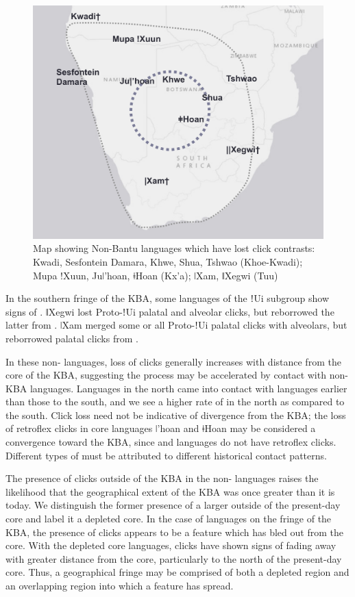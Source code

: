\documentclass[output=paper,newtxmath,modfonts,nonflat,draftmode]{langsci/langscibook}
\begin{document}
\begin{figure}
\includegraphics[height=.35\textheight]{figures/sands-fig5.png}
\caption{Map showing Non-Bantu languages which have lost click contrasts: Kwadi, Sesfontein Damara, Khwe, Shua, Tshwao (Khoe-Kwadi); Mupa !Xuun, Juǀ'hoan, ǂHoan (Kx'a); ǀXam, ǁXegwi (Tuu)} 
\label{fig:sands:5}
\end{figure}

In the southern fringe of the KBA, some  languages of the ǃUi subgroup show signs of . ǁXegwi lost Proto-ǃUi palatal and alveolar clicks, but reborrowed the latter from  \citep{sands2014, Traill1997}. ǀXam merged some or all Proto-ǃUi palatal clicks with alveolars, but reborrowed palatal clicks from  \citep{sands2014}. 

In these non- languages, loss of clicks generally increases with distance from the core of the KBA, suggesting the process may be accelerated by contact with non-KBA languages. Languages in the north came into contact with  languages earlier than those to the south, and we see a higher rate of  in the north as compared to the south. Click loss need not be indicative of divergence from the KBA; the loss of retroflex clicks in core languages ǀ'hoan and ǂHoan may be considered a convergence toward the KBA, since  and  languages do not have retroflex clicks. Different types of  must be attributed to different historical contact patterns. 

The presence of clicks outside of the KBA in the non- languages raises the likelihood that the geographical extent of the KBA was once greater than it is today. We distinguish the former presence of a larger  outside of the present-day core and label it a depleted core. In the case of  languages on the fringe of the KBA, the presence of clicks appears to be a feature which has bled out from the core. With the depleted core languages, clicks have shown signs of fading away with greater distance from the core, particularly to the north of the present-day core. Thus, a geographical fringe may be comprised of both a depleted region and an overlapping region into which a feature has spread. 
\end{document}
